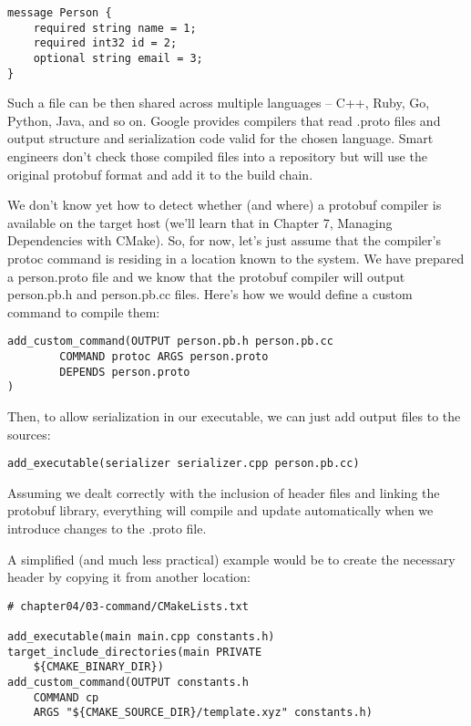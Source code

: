 \begin{lstlisting}[style=styleCMake]
message Person {
	required string name = 1;
	required int32 id = 2;
	optional string email = 3;
}
\end{lstlisting}

Such a file can be then shared across multiple languages – C++, Ruby, Go, Python, Java, and so on. Google provides compilers that read .proto files and output structure and serialization code valid for the chosen language. Smart engineers don't check those compiled files into a repository but will use the original protobuf format and add it to the build chain.

We don't know yet how to detect whether (and where) a protobuf compiler is available on the target host (we'll learn that in Chapter 7, Managing Dependencies with CMake). So, for now, let's just assume that the compiler's protoc command is residing in a location known to the system. We have prepared a person.proto file and we know that the protobuf compiler will output person.pb.h and person.pb.cc files. Here's how we would define a custom command to compile them:

\begin{lstlisting}[style=styleCMake]
add_custom_command(OUTPUT person.pb.h person.pb.cc
		COMMAND protoc ARGS person.proto
		DEPENDS person.proto
)
\end{lstlisting}

Then, to allow serialization in our executable, we can just add output files to the sources:

\begin{lstlisting}[style=styleCMake]
add_executable(serializer serializer.cpp person.pb.cc)
\end{lstlisting}

Assuming we dealt correctly with the inclusion of header files and linking the protobuf library, everything will compile and update automatically when we introduce changes to the .proto file.

A simplified (and much less practical) example would be to create the necessary header by copying it from another location:

\begin{lstlisting}[style=styleCMake]
# chapter04/03-command/CMakeLists.txt

add_executable(main main.cpp constants.h)
target_include_directories(main PRIVATE
	${CMAKE_BINARY_DIR})
add_custom_command(OUTPUT constants.h
	COMMAND cp
	ARGS "${CMAKE_SOURCE_DIR}/template.xyz" constants.h)
\end{lstlisting}

